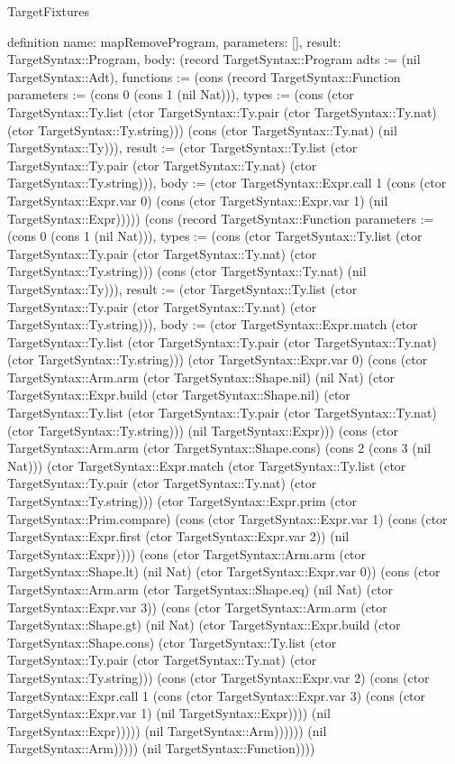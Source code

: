 \begin{lexlean}{TargetFixtures}
\begin{semanticmodule}
definition{
  name: mapRemoveProgram,
  parameters: [],
  result: TargetSyntax::Program,
  body: (record TargetSyntax::Program {adts := (nil TargetSyntax::Adt), functions := (cons (record TargetSyntax::Function {parameters := (cons 0 (cons 1 (nil Nat))), types := (cons (ctor TargetSyntax::Ty.list (ctor TargetSyntax::Ty.pair (ctor TargetSyntax::Ty.nat) (ctor TargetSyntax::Ty.string))) (cons (ctor TargetSyntax::Ty.nat) (nil TargetSyntax::Ty))), result := (ctor TargetSyntax::Ty.list (ctor TargetSyntax::Ty.pair (ctor TargetSyntax::Ty.nat) (ctor TargetSyntax::Ty.string))), body := (ctor TargetSyntax::Expr.call 1 (cons (ctor TargetSyntax::Expr.var 0) (cons (ctor TargetSyntax::Expr.var 1) (nil TargetSyntax::Expr))))}) (cons (record TargetSyntax::Function {parameters := (cons 0 (cons 1 (nil Nat))), types := (cons (ctor TargetSyntax::Ty.list (ctor TargetSyntax::Ty.pair (ctor TargetSyntax::Ty.nat) (ctor TargetSyntax::Ty.string))) (cons (ctor TargetSyntax::Ty.nat) (nil TargetSyntax::Ty))), result := (ctor TargetSyntax::Ty.list (ctor TargetSyntax::Ty.pair (ctor TargetSyntax::Ty.nat) (ctor TargetSyntax::Ty.string))), body := (ctor TargetSyntax::Expr.match (ctor TargetSyntax::Ty.list (ctor TargetSyntax::Ty.pair (ctor TargetSyntax::Ty.nat) (ctor TargetSyntax::Ty.string))) (ctor TargetSyntax::Expr.var 0) (cons (ctor TargetSyntax::Arm.arm (ctor TargetSyntax::Shape.nil) (nil Nat) (ctor TargetSyntax::Expr.build (ctor TargetSyntax::Shape.nil) (ctor TargetSyntax::Ty.list (ctor TargetSyntax::Ty.pair (ctor TargetSyntax::Ty.nat) (ctor TargetSyntax::Ty.string))) (nil TargetSyntax::Expr))) (cons (ctor TargetSyntax::Arm.arm (ctor TargetSyntax::Shape.cons) (cons 2 (cons 3 (nil Nat))) (ctor TargetSyntax::Expr.match (ctor TargetSyntax::Ty.list (ctor TargetSyntax::Ty.pair (ctor TargetSyntax::Ty.nat) (ctor TargetSyntax::Ty.string))) (ctor TargetSyntax::Expr.prim (ctor TargetSyntax::Prim.compare) (cons (ctor TargetSyntax::Expr.var 1) (cons (ctor TargetSyntax::Expr.first (ctor TargetSyntax::Expr.var 2)) (nil TargetSyntax::Expr)))) (cons (ctor TargetSyntax::Arm.arm (ctor TargetSyntax::Shape.lt) (nil Nat) (ctor TargetSyntax::Expr.var 0)) (cons (ctor TargetSyntax::Arm.arm (ctor TargetSyntax::Shape.eq) (nil Nat) (ctor TargetSyntax::Expr.var 3)) (cons (ctor TargetSyntax::Arm.arm (ctor TargetSyntax::Shape.gt) (nil Nat) (ctor TargetSyntax::Expr.build (ctor TargetSyntax::Shape.cons) (ctor TargetSyntax::Ty.list (ctor TargetSyntax::Ty.pair (ctor TargetSyntax::Ty.nat) (ctor TargetSyntax::Ty.string))) (cons (ctor TargetSyntax::Expr.var 2) (cons (ctor TargetSyntax::Expr.call 1 (cons (ctor TargetSyntax::Expr.var 3) (cons (ctor TargetSyntax::Expr.var 1) (nil TargetSyntax::Expr)))) (nil TargetSyntax::Expr))))) (nil TargetSyntax::Arm)))))) (nil TargetSyntax::Arm))))}) (nil TargetSyntax::Function)))})
}


\end{semanticmodule}
\end{lexlean}
